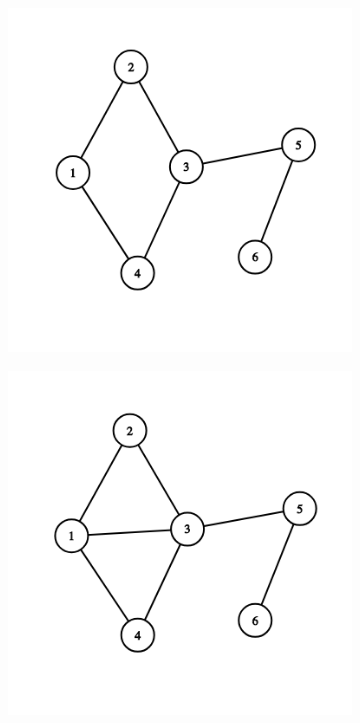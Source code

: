 \begin{solution}
\begin{figure}[H]
  \centering
  \begin{subfigure}[a]{0.24\linewidth}
    \includegraphics[width=\linewidth]{_img/344/04.png}
  \end{subfigure}
  \begin{subfigure}[a]{0.24\linewidth}
    \includegraphics[width=\linewidth]{_img/344/05.png}

\end{subfigure}
\end{figure}
\end{solution}

